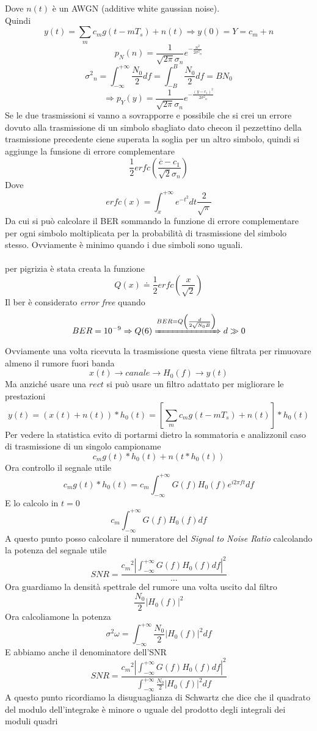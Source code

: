 \documentclass{article}
\newcommand{\accapo}{\\\hspace*{1cm}\\}
\newcommand{\intfity}{\int_{-\infty}^{+\infty}}
\begin{document}
Dove \(n(t)\) è un AWGN (additive white gaussian noise).\\
Quindi 
\[y(t)=\sum_{m}c_m g(t-m T_s)+n(t)\Rightarrow y(0)=Y=c_m+n\]
\[p_N(n)=\frac{1}{\sqrt{2\pi}\sigma_n}e^{-\frac{n^2}{2{\sigma^2}_n}}\]
\[{\sigma^2}_n=\intfity\frac{N_0}{2}df=\int_{-B}^B\frac{N_0}{2}df=B N_0\]
\[\Rightarrow p_Y(y)=\frac{1}{\sqrt{2\pi}\sigma_n}e^{-\frac{{(y-c_1)}^2}{2{\sigma^2}_n}}\]
Se le due trasmissioni si vanno a sovrapporre e possibile che si crei un errore dovuto alla trasmissione di un simbolo sbagliato dato checon il pezzettino della trasmissione precedente ciene superata la soglia per un altro simbolo, quindi si aggiunge la funsione di errore complementare
\[\frac{1}{2}erfc\left(\frac{\overline{c}-c_1}{\sqrt{2}\sigma_n}\right)\]
Dove
\[erfc(x)=\int_{x}^{+\infty}e^{-t^2}dt\frac{2}{\sqrt{\pi}}\]
Da cui si può calcolare il BER sommando la funzione di errore complementare per ogni simbolo moltiplicata per la probabilità di trasmissione del simbolo stesso. Ovviamente è minimo quando i due simboli sono uguali.
\accapo 
per pigrizia è stata creata la funzione
\[Q(x)\doteq\frac{1}{2}erfc\left(\frac{x}{\sqrt{2}}\right)\]
Il ber è considerato \textit{error free} quando
\[BER=10^{-9}\Rightarrow Q(6)\xRightarrow{BER=Q\left(\frac{d}{2\sqrt{N_0 B}}\right)}d\gg 0\]
Ovviamente una volta ricevuta la trasmissione questa viene filtrata per rimuovare almeno il rumore fuori banda
\[x(t)\to\boxed{canale}\to\boxed{H_0(f)}\to y(t)\]
Ma anziché usare una \(rect\) si può usare un filtro adattato per migliorare le prestazioni
\[y(t)=(x(t)+n(t))*h_0(t)=\left[\sum_m c_m g(t-mT_s)+n(t)\right]*h_0(t)\]
Per vedere la statistica evito di portarmi dietro la sommatoria e analizzonil caso di trasmissione di un singolo campioname 
\[c_m g(t)*h_0(t)+n(t*h_0(t))\]
Ora controllo il segnale utile
\[c_m g(t)*h_0(t)=c_m\intfity G(f)H_0(f)e^{i2\pi ft}df\]
E lo calcolo in \(t=0\)
\[c_m\intfity G(f)H_0(f)df\]
A questo punto posso calcolare il numeratore del \textit{Signal to Noise Ratio} calcolando la potenza del segnale utile
\[SNR=\frac{{c_m}^2\left|\intfity G(f)H_0(f)df\right|^2}{\cdots}\]
Ora guardiamo la densità spettrale del rumore una volta uscito dal filtro
\[\frac{N_0}{2}{|H_0(f)|}^2\]
Ora calcoliamone la potenza
\[{\sigma^2}\omega=\intfity\frac{N_0}{2}{|H_0(f)|}^2df\]
E abbiamo anche il denominatore dell'SNR
\[SNR=\frac{{c_m}^2\left|\intfity G(f)H_0(f)df\right|^2}{\intfity\frac{N_0}{2}{|H_0(f)|}^2df}\]
A questo punto ricordiamo la disuguaglianza di Schwartz che dice che il quadrato del modulo dell'integrake è minore o uguale del prodotto degli integrali dei moduli quadri
\end{document}
